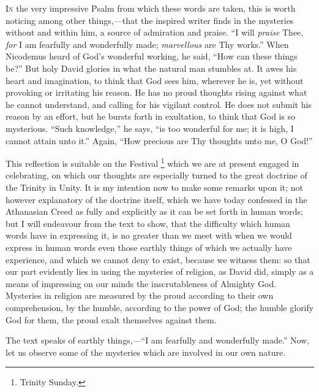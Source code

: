 I\textsc{n} the very impressive Psalm from which these words are taken, this
is worth noticing among other things,—that the inspired writer finds
in the mysteries without and within him, a source of admiration and
praise. ``I will \emph{praise} Thee, \emph{for} I am fearfully and
wonderfully made; \emph{marvellous} are Thy works.'' When
Nicodemus heard of God's wonderful working, he said, ``How can
these things be?'' But holy David glories in what the natural man
stumbles at. It awes his heart and imagination, to think that God sees
him, wherever he is, yet without provoking or irritating his reason.
He has no proud thoughts rising against what he cannot understand, and
calling for his vigilant control. He does not submit his reason by an
effort, but he bursts forth in exultation, to think that God is so
mysterious. ``Such knowledge,'' he says, ``is too
wonderful for me; it is high, I cannot attain unto it.'' Again,
``How precious are Thy thoughts unto me, O God!''

This reflection is suitable on the Festival \footnote{Trinity Sunday.} which we are at present engaged in celebrating, on which
our thoughts are especially turned to the great doctrine of the
Trinity in Unity. It is my intention now to make some remarks upon it;
not however explanatory of the doctrine itself, which we have today
confessed in the Athanasian Creed as fully and explicitly as it can be
set forth in human words; but I will endeavour from the text to show,
that the difficulty which human words have in expressing it, is no
greater than we meet with when we would express in human words even
those earthly things of which we actually have experience, and which
we cannot deny to exist, because we witness them: so that our part
evidently lies in using the mysteries of religion, as David did,
simply as a means of impressing on our minds the inscrutableness of
Almighty God. Mysteries in religion are measured by the proud
according to their own comprehension, by the humble, according to the
power of God; the humble glorify God for them, the proud exalt
themselves against them.

The text speaks of earthly things,—``I am fearfully and
wonderfully made.'' Now, let us observe some of the mysteries
which are involved in our own nature.

